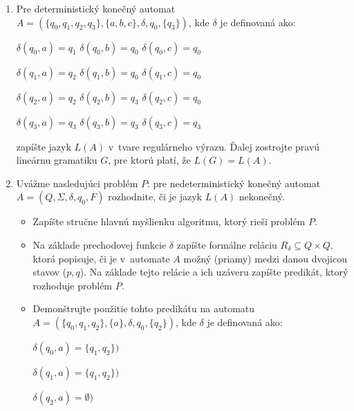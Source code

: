 \documentclass[11pt,a4paper]{article}
\begin{document}
		\begin{enumerate}
			\item Pre deterministický konečný automat $A = (\{q_0,q_1,q_2,q_3\}, \{a,b,c\}, \delta, q_0, \{q_3\})$, kde $\delta$ je definovaná ako:
			
			$\delta(q_0, a) = q_1$ \hspace{10pt} $\delta(q_0, b) = q_0$ \hspace{10pt} $\delta(q_0, c) = q_0$
			
			$\delta(q_1, a) = q_2$ \hspace{10pt} $\delta(q_1, b) = q_0$ \hspace{10pt} $\delta(q_1, c) = q_0$
			
			$\delta(q_2, a) = q_2$ \hspace{10pt} $\delta(q_2, b) = q_3$ \hspace{10pt} $\delta(q_2, c) = q_0$
			
			$\delta(q_3, a) = q_3$ \hspace{10pt} $\delta(q_3, b) = q_3$ \hspace{10pt} $\delta(q_3, c) = q_3$
			
			zapíšte jazyk $L(A)$ v~tvare regulárneho výrazu. Ďalej zostrojte pravú lineárnu gramatiku $G$, pre ktorú platí, že $L(G) = L(A)$.
			
			\item Uvážme nasledujúci problém $P$: pre nedeterministický konečný automat $A = (Q, \Sigma, \delta, q_0, F)$ rozhodnite, či je jazyk $L(A)$ nekonečný.
			
			\begin{itemize}
				\item Zapíšte stručne hlavnú myšlienku algoritmu, ktorý rieši problém $P$.
				\item Na základe prechodovej funkcie $\delta$ zapíšte formálne reláciu $R_\delta \subseteq Q \times Q$, ktorá popisuje, či je v~automate $A$ možný (priamy) medzi danou dvojicou stavov ($p,q$). Na základe tejto relácie a ich uzáveru zapíšte predikát, ktorý rozhoduje problém $P$.
				\item Demonštrujte použitie tohto predikátu na automatu $A = (\{q_0,q_1,q_2\}, \{a\}, \delta, q_0, \{q_2\})$, kde $\delta$ je definovaná ako:
				
				$\delta(q_0, a) = \{q_1, q_2\})$
				
				$\delta(q_1, a) = \{q_1, q_2\})$
				
				$\delta(q_2, a) = \emptyset)$
			\end{itemize}
		\end{enumerate}
\end{document}

